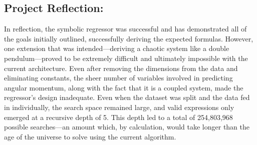\documentclass{article}
\begin{document}
\subsection{Project Reflection: }

In reflection, the symbolic regressor was successful and has demonstrated all of the goals initially outlined, successfully deriving the expected formulas. However, one extension that was intended—deriving a chaotic system like a double pendulum—proved to be extremely difficult and ultimately impossible with the current architecture. Even after removing the dimensions from the data and eliminating constants, the sheer number of variables involved in predicting angular momentum, along with the fact that it is a coupled system, made the regressor’s design inadequate. Even when the dataset was split and the data fed in individually, the search space remained large, and valid expressions only emerged at a recursive depth of 5. This depth led to a total of 254,803,968 possible searches—an amount which, by calculation, would take longer than the age of the universe to solve using the current algorithm.\\

\end{document}
